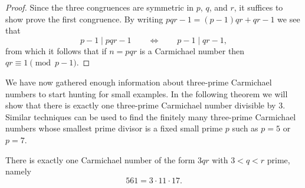 \begin{proof}
  Since the three congruences are symmetric in $p$, $q$, and $r$, it suffices to show prove the first congruence. By writing $pqr-1=(p-1)qr+qr-1$ we see that
  \begin{equation*}
    p-1\mid pqr-1\qquad\Leftrightarrow\qquad p-1\mid qr-1,
  \end{equation*}
  from which it follows that if $n=pqr$ is a Carmichael number then $qr\equiv 1\pmod{p-1}$.
\end{proof}

We have now gathered enough information about three-prime Carmichael numbers to start hunting for small examples. In the following theorem we will show that there is exactly one three-prime Carmichael number divisible by $3$. Similar techniques can be used to find the finitely many three-prime Carmichael numbers whose smallest prime divisor is a fixed small prime $p$ such as $p=5$ or $p=7$.

\begin{theorem}
  There is exactly one Carmichael number of the form $3qr$ with $3<q<r$ prime, namely
  \begin{equation*}
    561=3\cdot 11\cdot 17.
  \end{equation*}
\end{theorem}

